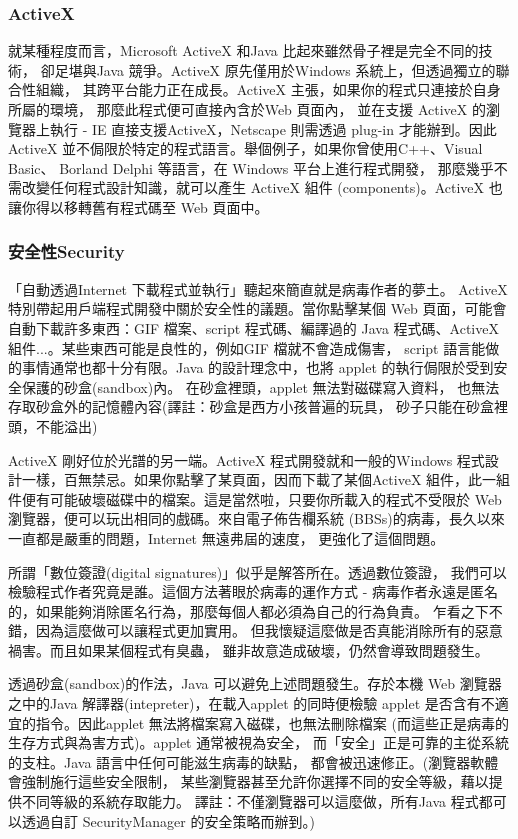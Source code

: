 \subsubsection{ActiveX}
就某種程度而言，Microsoft ActiveX 和Java 比起來雖然骨子裡是完全不同的技術，
卻足堪與Java 競爭。ActiveX 原先僅用於Windows 系統上，但透過獨立的聯合性組織，
其跨平台能力正在成長。ActiveX 主張，如果你的程式只連接於自身所屬的環境，
那麼此程式便可直接內含於Web 頁面內， 並在支援 ActiveX 的瀏覽器上執行 - IE
直接支援ActiveX，Netscape 則需透過 plug-in 才能辦到。因此 ActiveX
並不侷限於特定的程式語言。舉個例子，如果你曾使用C++、Visual Basic、
Borland Delphi 等語言，在 Windows 平台上進行程式開發，
那麼幾乎不需改變任何程式設計知識，就可以產生 ActiveX 組件
(components)。ActiveX 也讓你得以移轉舊有程式碼至 Web 頁面中。
\subsubsection{安全性Security}
「自動透過Internet 下載程式並執行」聽起來簡直就是病毒作者的夢土。
ActiveX 特別帶起用戶端程式開發中關於安全性的議題。當你點擊某個
Web 頁面，可能會自動下載許多東西：GIF 檔案、script 程式碼、編譯過的
Java 程式碼、ActiveX 組件...。某些東西可能是良性的，例如GIF 檔就不會造成傷害，
script 語言能做的事情通常也都十分有限。Java 的設計理念中，也將
applet 的執行侷限於受到安全保護的砂盒(sandbox)內。
在砂盒裡頭，applet 無法對磁碟寫入資料，
也無法存取砂盒外的記憶體內容(譯註：砂盒是西方小孩普遍的玩具，
砂子只能在砂盒裡頭，不能溢出)

ActiveX 剛好位於光譜的另一端。ActiveX 程式開發就和一般的Windows
程式設計一樣，百無禁忌。如果你點擊了某頁面，因而下載了某個ActiveX
組件，此一組件便有可能破壞磁碟中的檔案。這是當然啦，只要你所載入的程式不受限於
Web 瀏覽器，便可以玩出相同的戲碼。來自電子佈告欄系統
(BBSs)的病毒，長久以來一直都是嚴重的問題，Internet 無遠弗屆的速度，
更強化了這個問題。

所謂「數位簽證(digital signatures)」似乎是解答所在。透過數位簽證，
我們可以檢驗程式作者究竟是誰。這個方法著眼於病毒的運作方式 -
病毒作者永遠是匿名的，如果能夠消除匿名行為，那麼每個人都必須為自己的行為負責。
乍看之下不錯，因為這麼做可以讓程式更加實用。
但我懷疑這麼做是否真能消除所有的惡意禍害。而且如果某個程式有臭蟲，
雖非故意造成破壞，仍然會導致問題發生。

透過砂盒(sandbox)的作法，Java 可以避免上述問題發生。存於本機
Web 瀏覽器之中的Java 解譯器(intepreter)，在載入applet 的同時便檢驗
applet 是否含有不適宜的指令。因此applet 無法將檔案寫入磁碟，也無法刪除檔案
(而這些正是病毒的生存方式與為害方式)。applet 通常被視為安全，
而「安全」正是可靠的主從系統的支柱。Java 語言中任何可能滋生病毒的缺點，
都會被迅速修正。(瀏覽器軟體會強制施行這些安全限制，
某些瀏覽器甚至允許你選擇不同的安全等級，藉以提供不同等級的系統存取能力。
譯註：不僅瀏覽器可以這麼做，所有Java 程式都可以透過自訂
SecurityManager 的安全策略而辦到。)

